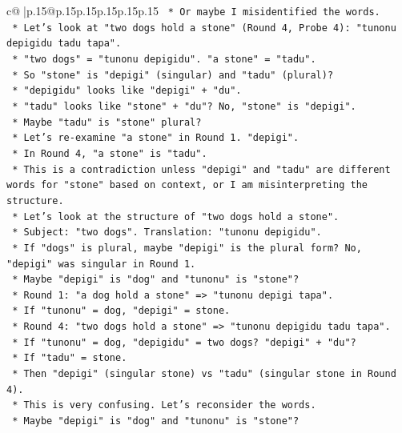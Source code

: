 \documentclass{article}
\begin{document}
{\begin{supertabular}{c@{$\;$}|p{.15\linewidth}@{}p{.15\linewidth}p{.15\linewidth}p{.15\linewidth}p{.15\linewidth}p{.15\linewidth}}
{{{\texttt{        *   Or maybe I misidentified the words.} \\
\texttt{        *   Let's look at "two dogs hold a stone" (Round 4, Probe 4): "tunonu depigidu tadu tapa".} \\
\texttt{        *   "two dogs" = "tunonu depigidu". "a stone" = "tadu".} \\
\texttt{        *   So "stone" is "depigi" (singular) and "tadu" (plural)?} \\
\texttt{        *   "depigidu" looks like "depigi" + "du".} \\
\texttt{        *   "tadu" looks like "stone" + "du"? No, "stone" is "depigi".} \\
\texttt{        *   Maybe "tadu" is "stone" plural?} \\
\texttt{        *   Let's re{-}examine "a stone" in Round 1. "depigi".} \\
\texttt{        *   In Round 4, "a stone" is "tadu".} \\
\texttt{        *   This is a contradiction unless "depigi" and "tadu" are different words for "stone" based on context, or I am misinterpreting the structure.} \\
\texttt{        *   Let's look at the structure of "two dogs hold a stone".} \\
\texttt{        *   Subject: "two dogs". Translation: "tunonu depigidu".} \\
\texttt{        *   If "dogs" is plural, maybe "depigi" is the plural form? No, "depigi" was singular in Round 1.} \\
\texttt{        *   Maybe "depigi" is "dog" and "tunonu" is "stone"?} \\
\texttt{        *   Round 1: "a dog hold a stone" => "tunonu depigi tapa".} \\
\texttt{        *   If "tunonu" = dog, "depigi" = stone.} \\
\texttt{        *   Round 4: "two dogs hold a stone" => "tunonu depigidu tadu tapa".} \\
\texttt{        *   If "tunonu" = dog, "depigidu" = two dogs? "depigi" + "du"?} \\
\texttt{        *   If "tadu" = stone.} \\
\texttt{        *   Then "depigi" (singular stone) vs "tadu" (singular stone in Round 4).} \\
\texttt{        *   This is very confusing. Let's reconsider the words.} \\
\texttt{        *   Maybe "depigi" is "dog" and "tunonu" is "stone"?} \\
}}}
\end{supertabular}}
\end{document}

